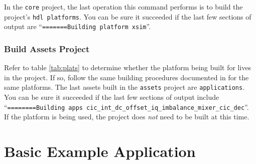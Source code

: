 In the \texttt{core} project, the last operation this command performs is to build the project's \texttt{hdl platforms}. You can be sure it succeeded if the last few sections of output are ``\texttt{=======Building platform xsim}''.\\
\begin{center}
\end{center}


\subsubsection{Build Assets Project}
Refer to table \ref{tab:plats} to determine whether the platform being built for lives in the  project. If so, follow the same building procedures documented in  for the same platforms. The last assets built in the \texttt{assets} project are \texttt{applications}. You can be sure it succeeded if the last few sections of output include ``\texttt{========Building apps cic\_int\_dc\_offset\_iq\_imbalance\_mixer\_cic\_dec}''.\\

If the  platform is being used, the  project does \textit{not} need to be built at this time.\\

\newpage
\section{Basic Example Application}
\label{sec:basic_example}

\begin{center}
\end{center}


